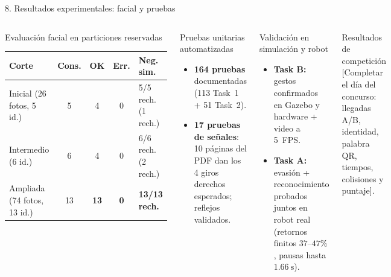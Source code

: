 \documentclass[aspectratio=169,10pt]{beamer}
\begin{document}
\begin{frame}{8. Resultados experimentales: facial y pruebas}
  \small
  \begin{columns}[T,onlytextwidth]
    \begin{block}{Evaluación facial en particiones reservadas}
      \scriptsize
      \setlength{\tabcolsep}{3pt}
      \begin{tabularx}{\textwidth}{@{}P{2.4cm}cccY@{}}
        \hline
        \textbf{Corte} & \textbf{Cons.} & \textbf{OK} & \textbf{Err.} & \textbf{Neg. sim.}\\
        \hline
        Inicial (26 fotos, 5 id.) & 5 & 4 & 0 & 5/5 rech. (1 rech.)\\
        Intermedio (6 id.) & 6 & 4 & 0 & 6/6 rech. (2 rech.)\\
        Ampliada (74 fotos, 13 id.) & 13 & \textbf{13} & \textbf{0} & \textbf{13/13 rech.}\\
        \hline
      \end{tabularx}
    \end{block}
    \vspace{0.35em}
    \begin{block}{Pruebas unitarias automatizadas}
      \footnotesize
      \begin{itemize}
        \item \textbf{164 pruebas} documentadas (113 Task~1 + 51 Task~2).
        \item \textbf{17 pruebas de señales}: 10 páginas del PDF dan los 4 giros derechos esperados; reflejos validados.
      \end{itemize}
    \end{block}

    \begin{block}{Validación en simulación y robot}
      \footnotesize
      \begin{itemize}
        \item \textbf{Task B:} gestos confirmados en Gazebo y hardware + video a 5~FPS.
        \item \textbf{Task A:} evasión + reconocimiento probados juntos en robot real (retornos finitos $37$--$47\%$, pausas hasta $1.66\ \mathrm{s}$).
      \end{itemize}
    \end{block}
    \vspace{0.35em}
    \begin{alertblock}{Resultados de competición}
      \scriptsize [Completar el día del concurso: llegadas A/B, identidad, palabra QR, tiempos, colisiones y puntaje].
    \end{alertblock}
  \end{columns}
\end{frame}
\end{document}
